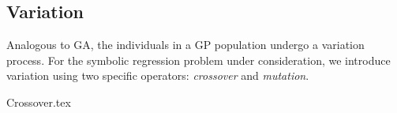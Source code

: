 \subsection{Variation}
\label{sec:bg:gp:variation}
  Analogous to GA, the individuals in a GP population undergo a variation
  process.
  For the symbolic regression problem under consideration, we introduce
  variation using two specific operators: \emph{crossover} and \emph{mutation}.

  {Crossover.tex}
%